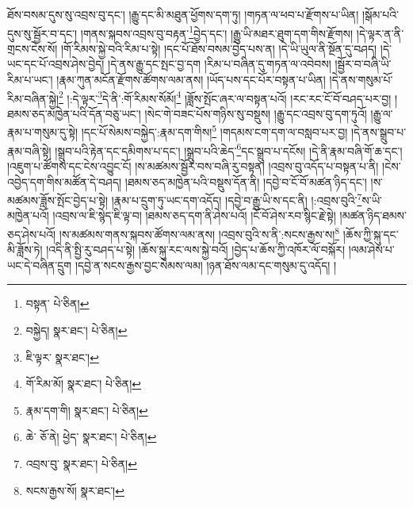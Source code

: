 ཐོས་བསམ་དུས་སུ་འབྲས་བུ་དང་། །རྒྱུ་དང་མི་མཐུན་ཕྱོགས་དག་ཏུ། །གཏན་ལ་ཕབ་པ་རྫོགས་པ་ཡིན། །སྒོམ་པའི་དུས་སུ་སྦྱོར་བ་དང་། །གནས་སྐབས་འབྲས་བུ་བརྟན་\footnote{བསྟན་  པེ་ཅིན། }བྱེད་དང་། །རྒྱུ་ཡི་མཐར་ཐུག་དག་གིས་རྫོགས། །དེ་ལྟར་ན་ནི་གྲངས་ངེས་སོ། །གོ་རིམས་སྐྱེ་བའི་རིམ་པ་སྟེ། །དང་པོ་ཐོས་བསམ་བྱེད་པས་ན། །དེ་ཡི་ཡུལ་ནི་སྔོན་དུ་བཤད། །དེ་ཡང་དང་པོ་འབྲས་ཤེས་བྱེད། །དེ་ནས་རྒྱུ་དང་སྤང་བྱ་དག །རིམ་པ་བཞིན་དུ་གཏན་ལ་འབེབས། །སྦྱོར་བ་བཞི་ཡི་རིམ་པ་ཡང་། །རྣམ་ཀུན་མངོན་རྫོགས་ཚོགས་ལམ་ནས། །ཡོད་པས་དང་པོར་བསྟན་པ་ཡིན། །དེ་ནས་གསུམ་པོ་རིམ་བཞིན་སྐྱེ།\footnote{བསྐྱེད།  སྣར་ཐང་།  པེ་ཅིན། } །:དེ་ལྟར་\footnote{ཇི་ལྟར་  སྣར་ཐང་། }དེ་ནི་:གོ་རིམས་སོམོ།\footnote{གོ་རིམ་མོ།  སྣར་ཐང་།  པེ་ཅིན། } །ཟློས་སྤོང་ཞར་ལ་བསྟན་པའོ། །རང་རང་ངོ་བོ་བཤད་པར་བྱ། །ཐམས་ཅད་མཁྱེན་པའི་དོན་བཅུ་ཡང་། །སེང་གེ་བཟང་པོས་གཉིས་སུ་བསྡུས། །རྒྱུ་དང་འབྲས་བུ་དག་ཏུའོ། །རྒྱུ་ལ་རྣམ་པ་གསུམ་དུ་སྟེ། །དང་པོ་སེམས་བསྐྱེད་:རྣམ་དག་གིས།\footnote{རྣམ་དག་གི།  སྣར་ཐང་།  པེ་ཅིན། } །གདམས་ངག་དག་ལ་བསླབ་པར་བྱ། །དེ་ནས་སྒྲུབ་པ་རྣམ་བཞི་སྟེ། །སྒྲུབ་པའི་རྟེན་དང་དམིགས་པ་དང་། །སྒྲུབ་པའི་ཆེད་\footnote{ཆེ་  ཅོ་ནེ། ཕྱེད་  སྣར་ཐང་།  པེ་ཅིན། }དང་སྒྲུབ་པ་དངོས། །དེ་ནི་རྣམ་བཞི་གོ་ཆ་དང་། །འཇུག་པ་ཚོགས་དང་ངེས་འབྱུང་ངོ། །ས་མཚམས་སྦྱོར་བས་བཞི་རུ་བསྟན། །འབྲས་བུ་འདོད་པ་བསྟན་པ་ནི། །ངེས་འབྱེད་དག་གིས་མཚོན་དེ་བཤད། །ཐམས་ཅད་མཁྱེན་པའི་བསྡུས་དོན་ནི། །དབྱེ་བ་ངོ་བོ་མཚན་ཉིད་དང་། །ས་མཚམས་ཟློས་སྤོང་བྱེད་པ་སྟེ། །རྣམ་པ་དྲུག་ཏུ་ཡང་དག་འདོད། །དབྱེ་བ་རྒྱུ་ཡི་ས་དང་ནི། །:འབྲས་བུའི་\footnote{འབྲས་བུ་  སྣར་ཐང་།  པེ་ཅིན། }ས་ཡི་མཁྱེན་པའོ། །འབྲས་ལ་ཇི་སྙེད་ཇི་ལྟ་བ། །ཐམས་ཅད་དག་ནི་ཤེས་པའོ། །ངོ་བོ་ཤེས་རབ་སྙིང་རྗེ་སྟེ། །མཚན་ཉིད་ཐམས་ཅད་ཤེས་པའོ། །ས་མཚམས་གནས་སྐབས་ཚོགས་ལམ་ནས། །འབྲས་བུའི་ས་ནི་:སངས་རྒྱས་ས།\footnote{སངས་རྒྱས་སོ།  སྣར་ཐང་། } །ཆོས་ཀྱི་སྐུ་དང་མི་ཟློས་ཏེ། །འདི་ནི་སྤྱི་རུ་བཤད་པ་སྟེ། །ཆོས་སྐུ་རང་ལས་སྐྱེ་བའོ། །བྱེད་པ་ཆོས་ཀྱི་འཁོར་ལོ་བསྐོར། །ལམ་ཤེས་པ་ཡང་དེ་བཞིན་དྲུག །དབྱེ་ན་སངས་རྒྱས་བྱང་སེམས་ལམ། །ཉན་ཐོས་ལམ་དང་གསུམ་དུ་འདོད། །
